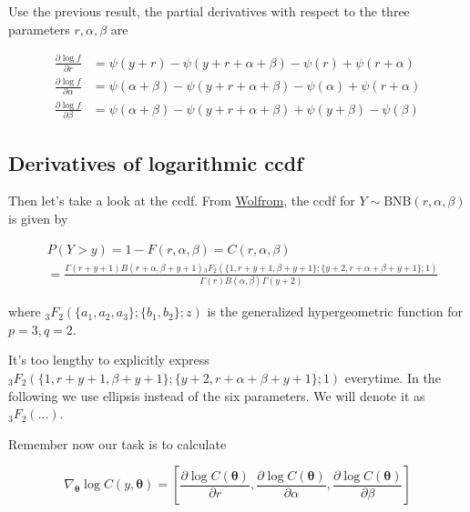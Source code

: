 \documentclass[11pt]{article}
\begin{document}
Use the previous result, the partial derivatives with respect to the three parameters $r, \alpha, \beta$ are

\begin{equation}
  \begin{aligned}
\frac{\partial \log f}{\partial r} &= \psi(y+r) - \psi(y+r+\alpha+\beta) - \psi(r) + \psi(r+\alpha) \\
\frac{\partial \log f}{\partial \alpha} &= \psi(\alpha+\beta) - \psi(y+r+\alpha+\beta) - \psi(\alpha) + \psi(r+\alpha) \\
\frac{\partial \log f}{\partial \beta} &= \psi(\alpha+\beta) - \psi(y+r+\alpha+\beta) + \psi(y+\beta) - \psi(\beta)
  \end{aligned}
\end{equation}


\subsection*{Derivatives of logarithmic ccdf}
Then let's take a look at the ccdf. From \href{https://reference.wolfram.com/language/ref/BetaNegativeBinomialDistribution.html}{Wolfrom}, the ccdf for $Y\sim \text{BNB}(r,\alpha,\beta)$ is given by

\begin{equation}
\begin{aligned}
& P(Y > y) = 1 - F(r,\alpha,\beta) = C(r,\alpha,\beta) \\
&= \frac{\Gamma (r+y +1) B(r+\alpha ,\beta +y +1) {}_3F_2(\{1,r+y +1,\beta +y +1\}; \{y +2,r+\alpha +\beta +y +1\};1)}{\Gamma (r) B(\alpha ,\beta ) \Gamma (y +2)}
\end{aligned}
\end{equation}

where $_3F_2(\{a_1,a_2,a_3\}; \{b_1,b_2\};z)$ is the generalized hypergeometric function \citep[Ch.~16]{olver2010nist} for $p=3,q=2$.

It's too lengthy to explicitly express ${}_3F_2(\{1,r+y +1,\beta +y +1\}; \{y +2,r+\alpha +\beta +y +1\};1)$ everytime. In the following we use ellipsis instead of the six parameters. We will denote it as $_3F_2(...)$.


Remember now our task is to calculate

\begin{equation}
	\nabla _{\boldsymbol {\theta}}\log C(y,\boldsymbol\theta) = \left[ \frac{\partial \log C(\boldsymbol {\theta})}{\partial r}, \frac{\partial \log C(\boldsymbol {\theta})}{\partial \alpha}, \frac{\partial \log C(\boldsymbol {\theta})}{\partial \beta} \right]
\end{equation}
\end{document}
